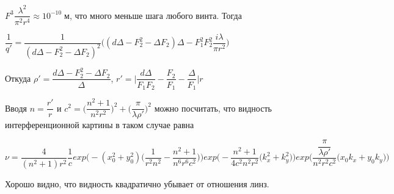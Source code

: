 $F^3 \dfrac{ \lambda^2}{\pi^2 r^4} \approx 10^{-10} \; м $, что много меньше шага любого винта. Тогда



$\dfrac{1}{q'}= \dfrac{1}{(d\Delta - F_{2}^2 -\Delta F_{2})^2} \Big((d\Delta - F_{2}^2 - \Delta F_{2})\Delta - F^{2}_{1}F^{2}_{2}\dfrac{i \lambda}{\pi r^2}\Big)$



Откуда $\rho ' =  \dfrac{d\Delta - F_{2}^2 - \Delta F_{2}}{\Delta}$, $r' = \Big |\dfrac{d\Delta}{F_{1}F_{2}} - \dfrac{F_{2}}{F_{1}} - \dfrac{\Delta}{F_{1}}\Big|r$




Вводя $n = \dfrac{r'}{r}$ и $c^2 = \Big(\dfrac{n^2 + 1}{n^2r^2}\Big) ^2 + \Big(\dfrac{\pi}{\lambda \rho '}\Big) ^2$ можно посчитать, что видность интерференционной картины в таком случае равна 



$\nu = \dfrac{4}{(n^2 + 1)r^2} \dfrac{1}{c} exp\Big(- (x_{0}^2 + y_{0}^2 ) \Big(\dfrac{1}{r^2n^2} - \dfrac{n^2 + 1}{n^6 r^6 c^2}\Big)\Big)  exp\Big( -\dfrac{n^2 + 1}{4 c^2 n^2 r^2}(k_{x}^2 + k_{y}^2\Big) \Big)exp\Big(  \dfrac{\dfrac{\pi}{\lambda \rho'}}{n^2 r^2 c^2}(x_{0}k_{x} + y_{0}k_{y}\Big)\Big)$


Хорошо видно, что видность квадратично убывает от отношения линз.


%
